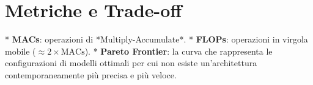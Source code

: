\documentclass[12pt, a4paper]{report}
\begin{document}
\section{Metriche e Trade-off}

*   \textbf{MACs}: operazioni di *Multiply-Accumulate*.
*   \textbf{FLOPs}: operazioni in virgola mobile ($\approx 2 \times \text{MACs}$).
*   \textbf{Pareto Frontier}: la curva che rappresenta le configurazioni di modelli ottimali
    per cui non esiste un'architettura contemporaneamente più precisa e più veloce.
\end{document}
